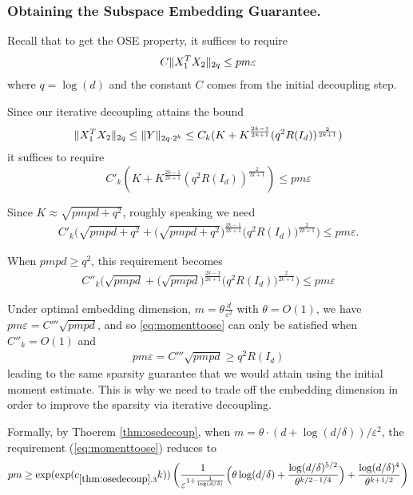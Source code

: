 \documentclass[11pt]{amsart}
\numberwithin{equation}{section}
\numberwithin{equation}{section}
\DeclarePairedDelimiter{\norm}{\lVert}{\rVert}
\begin{document}
\subsubsection{Obtaining the Subspace Embedding Guarantee.}
\label{subsubsec:whtnotoptimaldimension}

Recall that to get the OSE property, it suffices to require
\begin{align*}
    C\norm{X_1^TX_2}_{2q} \le pm \varepsilon
\end{align*}
where $q=\log(d)$ and the constant $C$ comes from the initial decoupling step.

Since our iterative decoupling attains the bound
\begin{align*}
    \norm{X_1^TX_2}_{2q} \le \norm{Y}_{2q \cdot 2^k} \le C_k(K+K^{\frac{2k-1}{2k+1}}(q^{2}R(I_d))^{\frac{2}{2k+1}})
\end{align*}
it suffices to require
\begin{equation}\label{eq:momenttoose}
    C'_k(K+K^{\frac{2k-1}{2k+1}}(q^{2}R(I_d))^{\frac{2}{2k+1}}) \le pm \varepsilon
\end{equation}

Since $K \approx \sqrt{pmpd+q^2}$, roughly speaking we need
\begin{align*}    C'_k\Big(\sqrt{pmpd+q^2}+\big(\sqrt{pmpd+q^2}\big)^{\frac{2k-1}{2k+1}}\big(q^{2}R(I_d)\big)^{\frac{2}{2k+1}}\Big) \le pm \varepsilon.
\end{align*}

When $pmpd\ge q^2$, this requirement becomes
\begin{align*}
    C''_k\Big(\sqrt{pmpd}+\big(\sqrt{pmpd}\big)^{\frac{2k-1}{2k+1}}\big(q^{2}R(I_d)\big)^{\frac{2}{2k+1}}\Big) \le pm \varepsilon
\end{align*}

Under optimal embedding dimension, $m=\theta\frac{d}{\varepsilon^2}$ with $\theta=O(1)$, we have $pm \varepsilon=C'''\sqrt{pmpd}$, and so \eqref{eq:momenttoose} can only be satisfied when $C''_k=O(1)$ and
\begin{align*}
    pm\varepsilon = C'''\sqrt{pmpd} \ge q^{2}R(I_d)
\end{align*}
leading to the same sparsity guarantee that we would attain using the initial moment estimate. This is why we need to trade off the embedding dimension in order to improve the sparsity via iterative decoupling.


Formally, by Thoerem \ref{thm:osedecoup}, when $m=\theta\cdot(d+\log(d/\delta))/\varepsilon^2$, the requirement (\ref{eq:momenttoose}) reduces to 
\begin{align*}
    {pm } \ge {\exp(\exp(c_{\ref{thm:osedecoup}.3}k))}\left(\frac{1}{\varepsilon^{1+\frac{1}{\log(d/\delta)}}}\Big(\theta \log(d/\delta)+\frac{\log(d/\delta)^{5/2}}{\theta ^{k/2-1/4}}\Big)+\frac{ \log(d/\delta)^{4}}{\theta ^{k+1/2}}\right)
\end{align*}
\end{document}
